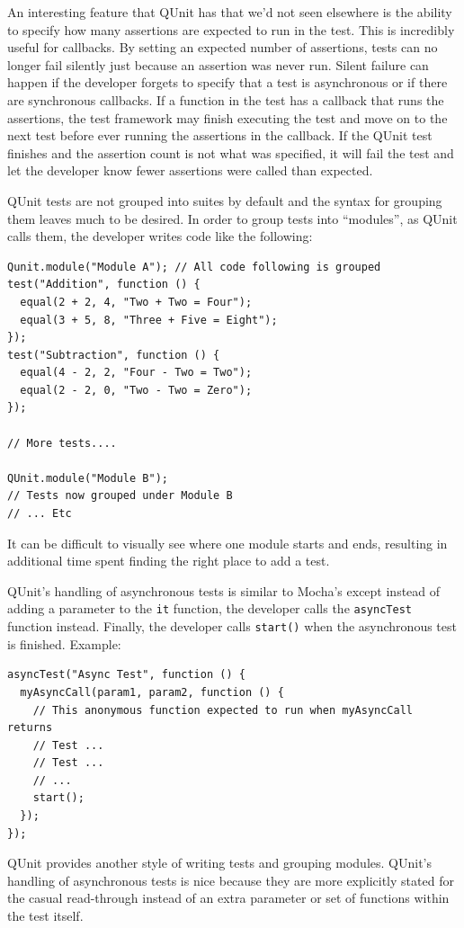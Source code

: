 \documentclass[12pt]{ucthesis}
\begin{document}
An interesting feature that QUnit has that we'd not seen elsewhere is the ability to specify how many assertions are expected to run in the test. This is incredibly useful for callbacks. By setting an expected number of assertions, tests can no longer fail silently just because an assertion was never run. Silent failure can happen if the developer forgets to specify that a test is asynchronous or if there are synchronous callbacks. If a function in the test has a callback that runs the assertions, the test framework may finish executing the test and move on to the next test before ever running the assertions in the callback. If the QUnit test finishes and the assertion count is not what was specified, it will fail the test and let the developer know fewer assertions were called than expected.

QUnit tests are not grouped into suites by default and the syntax for grouping them leaves much to be desired. In order to group tests into ``modules'', as QUnit calls them, the developer writes code like the following:
\begin{lstlisting}
Qunit.module("Module A"); // All code following is grouped
test("Addition", function () {
  equal(2 + 2, 4, "Two + Two = Four");
  equal(3 + 5, 8, "Three + Five = Eight");
});
test("Subtraction", function () {
  equal(4 - 2, 2, "Four - Two = Two");
  equal(2 - 2, 0, "Two - Two = Zero");
});

// More tests....

QUnit.module("Module B");
// Tests now grouped under Module B
// ... Etc
\end{lstlisting}
It can be difficult to visually see where one module starts and ends, resulting in additional time spent finding the right place to add a test.

QUnit's handling of asynchronous tests is similar to Mocha's except instead of adding a parameter to the \lstinline{it} function, the developer calls the \lstinline{asyncTest} function instead. Finally, the developer calls \lstinline{start()} when the asynchronous test is finished. Example:
\begin{lstlisting}
asyncTest("Async Test", function () {
  myAsyncCall(param1, param2, function () {
    // This anonymous function expected to run when myAsyncCall returns
    // Test ...
    // Test ...
    // ...
    start();
  });
});
\end{lstlisting}

QUnit provides another style of writing tests and grouping modules. QUnit's handling of asynchronous tests is nice because they are more explicitly stated for the casual read-through instead of an extra parameter or set of functions within the test itself.
\end{document}
